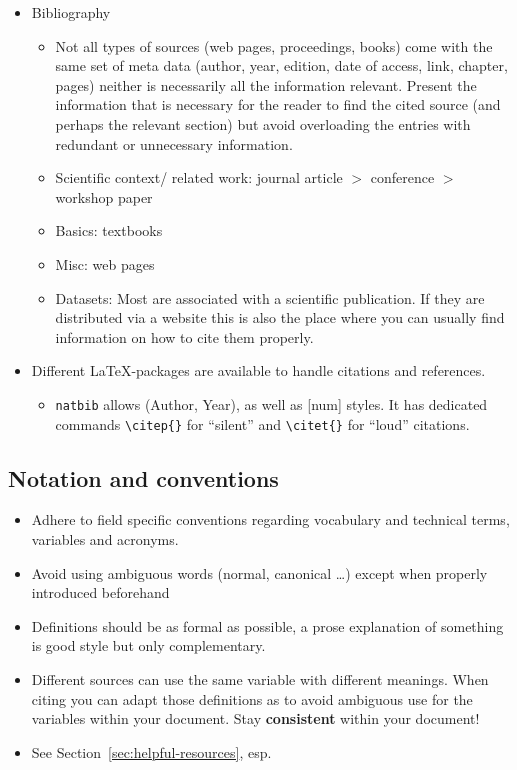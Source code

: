 \documentclass[twocolumn]{mlai-guide}
\begin{document}
\begin{itemize}
	\item Bibliography \label{general_bib}
	\begin{itemize}
		\item Not all types of sources (web pages, proceedings, books) come with the same set of meta data (author, year, edition, date of access, link, chapter, pages) neither is necessarily all the information relevant. Present the information that is necessary for the reader to find the cited source (and perhaps the relevant section) but avoid overloading the entries with redundant or unnecessary information.
		\item Scientific context/ related work: journal article $>$ conference $>$ workshop paper
		\item Basics: textbooks
		\item Misc: web pages
		\item Datasets: Most are associated with a scientific publication. If they are distributed via a website this is also the place where you can usually find information on how to cite them properly.
	\end{itemize}
	\item Different \LaTeX-packages are available to handle citations and references. 
	\begin{itemize}
		\item \verb+natbib+ allows (Author, Year), as well as [num] styles. It has dedicated commands \verb+\citep{}+ for ``silent'' and \verb+\citet{}+ for ``loud'' citations.
	\end{itemize}

\end{itemize}

\subsection{Notation and conventions}

\begin{itemize}
	\item Adhere to field specific conventions regarding vocabulary and technical terms, variables and acronyms.
	\item Avoid using ambiguous words (normal, canonical \dots) except when properly introduced beforehand
	\item Definitions should be as formal as possible, a prose explanation of something is good style but only complementary.
	\item Different sources can use the same variable with different meanings. When citing you can adapt those definitions as to avoid ambiguous use for the variables within your document. Stay \textbf{consistent} within your document!
	\item See Section~\ref{sec:helpful-resources}, esp. \cite[pp. 1-8]{knuth_mathematical_writing}
\end{itemize}
\end{document}
